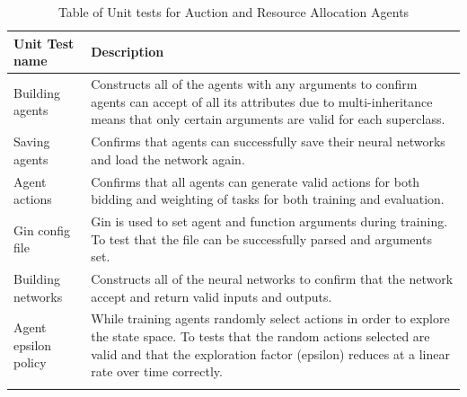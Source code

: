 \begin{longtable}{|p{3cm}|p{11cm}|} \hline
    \textbf{Unit Test name} & \textbf{Description} \\ \hline
    Building agents & Constructs all of the agents with any arguments to confirm agents can accept of all its
        attributes due to multi-inheritance means that only certain arguments are valid for each superclass. \\ \hline
    Saving agents & Confirms that agents can successfully save their neural networks and load
        the network again. \\ \hline
    Agent actions & Confirms that all agents can generate valid actions for both bidding and weighting of tasks for
        both training and evaluation. \\ \hline
    Gin config file & Gin is used to set agent and function arguments during training. To test that the
        file can be successfully parsed and arguments set. \\ \hline
    Building networks & Constructs all of the neural networks to confirm that the network accept and return valid
        inputs and outputs. \\ \hline
    Agent epsilon policy & While training agents randomly select actions in order to explore the state space.
        To tests that the random actions selected are valid and that the exploration factor (epsilon) reduces at a
        linear rate over time correctly. \\ \hline
    \caption{Table of Unit tests for Auction and Resource Allocation Agents}
    \label{tab:agent-unit-tests}
\end{longtable}

